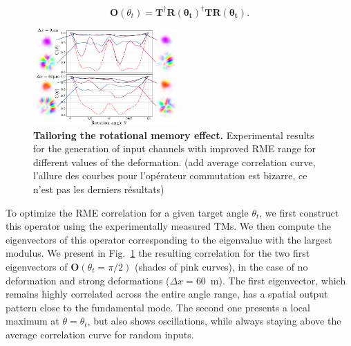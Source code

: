 \documentclass[aps,prl,twocolumn, amsmath,amssymb,superscriptaddress]{revtex4-2}
\begin{document}
\begin{equation}
    \mathbf{O}(\theta_t) = \mathbf{T}^\dagger\mathbf{R(\theta_t)}^\dagger\mathbf{T}\mathbf{R(\theta_t)}.
\end{equation}

\begin{figure}[ht]
\includegraphics[width=0.49\textwidth]{images/Fig4.pdf}
\caption{
\textbf{Tailoring the rotational memory effect.}
Experimental results for the generation of input channels with 
improved RME range for different values of the deformation.
(add average correlation curve, l'allure des courbes pour l'opérateur commutation est bizarre, ce n'est pas les derniers résultats)
}
\label{fig:tailoring}
\end{figure}



To optimize the RME correlation for a given target angle $\theta_t$, 
we first construct this operator using the experimentally measured TMs.
We then compute the eigenvectors of this operator corresponding to the eigenvalue 
with the largest modulus. 
We present in Fig.~\ref{fig:tailoring} the resulting correlation for 
the two first eigenvectors of $\mathbf{O}(\theta_t = \pi/2)$ (shades of pink curves), 
in the case of no deformation and strong deformations ($\Delta x = 60$~\textmu m). 
The first eigenvector, which remains highly correlated across the entire angle range, 
has a spatial output pattern close to the fundamental mode. 
The second one presents a local maximum at $\theta = \theta_t$, 
but also shows oscillations, while always staying above the average correlation curve for random inputs.
\end{document}
